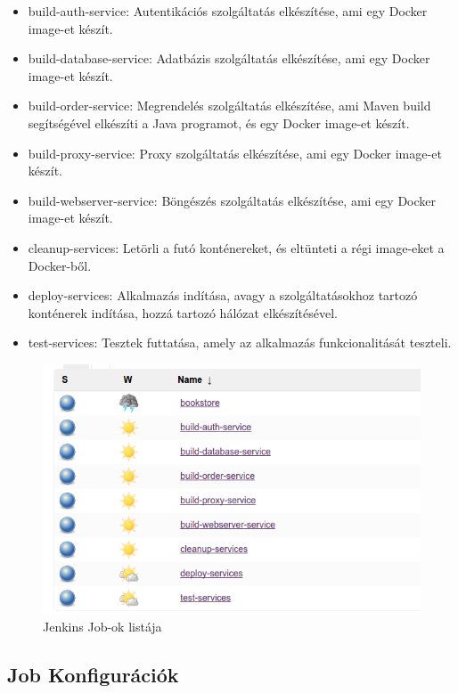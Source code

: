 \documentclass[11pt,magyar,a4paper,twoside,]{report}
\providecommand{\tightlist}{%
  \setlength{\itemsep}{0pt}\setlength{\parskip}{0pt}}
\let\Oldincludegraphics\includegraphics
\renewcommand{\includegraphics}[1]{
\begin{adjustbox}{max size={\textwidth}{\textheight}}
    \Oldincludegraphics[scale=0.6]{#1}%
\end{adjustbox}
}
\begin{document}
\begin{itemize}
\tightlist
\item
  build-auth-service: Autentikációs szolgáltatás elkészítése, ami egy
  Docker image-et készít.
\item
  build-database-service: Adatbázis szolgáltatás elkészítése, ami egy
  Docker image-et készít.
\item
  build-order-service: Megrendelés szolgáltatás elkészítése, ami Maven
  build segítségével elkészíti a Java programot, és egy Docker image-et
  készít.
\item
  build-proxy-service: Proxy szolgáltatás elkészítése, ami egy Docker
  image-et készít.
\item
  build-webserver-service: Böngészés szolgáltatás elkészítése, ami egy
  Docker image-et készít.
\item
  cleanup-services: Letörli a futó konténereket, és eltünteti a régi
  image-eket a Docker-ből.
\item
  deploy-services: Alkalmazás indítása, avagy a szolgáltatásokhoz
  tartozó konténerek indítása, hozzá tartozó hálózat elkészítésével.
\item
  test-services: Tesztek futtatása, amely az alkalmazás funkcionalitását
  teszteli.
\end{itemize}

\begin{figure}[H]
\centering
\includegraphics{img/job-view.png}
\caption{Jenkins Job-ok listája}
\end{figure}

\subsection{Job Konfigurációk}\label{job-konfiguruxe1ciuxf3k}
\end{document}
